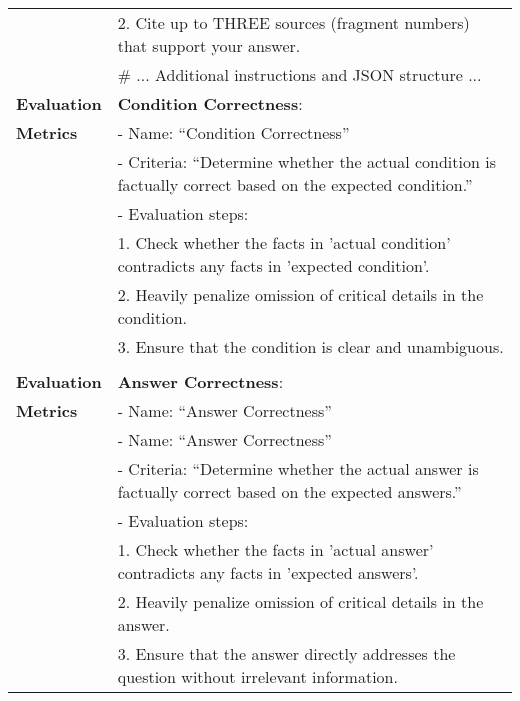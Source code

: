 \begin{tabular}{l p{}}
& 2. Cite up to THREE sources (fragment numbers) that support your answer. \\
& \# ... Additional instructions and JSON structure ... \\
\hline
\textbf{Evaluation} & \textbf{Condition Correctness}: \\
\textbf{Metrics} & - Name: ``Condition Correctness'' \\
& - Criteria: ``Determine whether the actual condition is factually correct based on the expected condition.'' \\
& - Evaluation steps: \\
& 1. Check whether the facts in 'actual condition' contradicts any facts in 'expected condition'. \\
& 2. Heavily penalize omission of critical details in the condition. \\
& 3. Ensure that the condition is clear and unambiguous. \\
& \\
\hline
\textbf{Evaluation} & \textbf{Answer Correctness}: \\
\textbf{Metrics} & - Name: ``Answer Correctness'' \\
& - Name: ``Answer Correctness'' \\
& - Criteria: ``Determine whether the actual answer is factually correct based on the expected answers.'' \\
& - Evaluation steps: \\
& 1. Check whether the facts in 'actual answer' contradicts any facts in 'expected answers'. \\
& 2. Heavily penalize omission of critical details in the answer. \\
& 3. Ensure that the answer directly addresses the question without irrelevant information. \\
\hline
\end{tabular}
